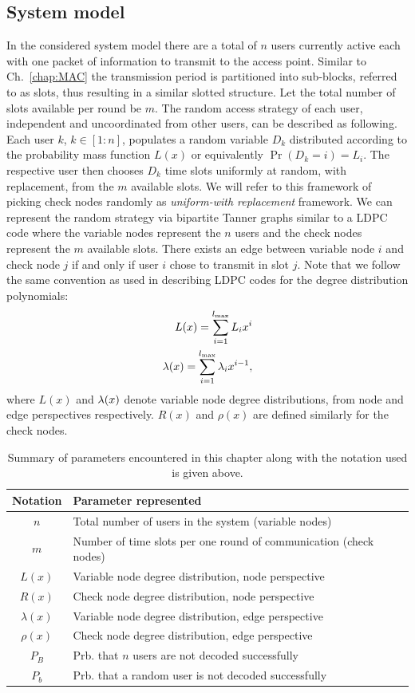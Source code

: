 \subsection{System model}
In the considered system model there are a total of $n$ users currently active each with one packet of information to transmit to the access point. Similar to Ch.~\ref{chap:MAC} the transmission period is partitioned into sub-blocks, referred to as slots, thus resulting in a similar slotted structure. Let the total number of slots available per round be $m$. The random access strategy of each user, independent and uncoordinated from other users, can be described as following. Each user $k$, $k\in [1:n]$, populates a random variable $D_{k}$ distributed according to the probability mass function $L(x)$ or equivalently $\Pr(D_{k}=i)=L_{i}$. The respective user then chooses $D_{k}$ time slots uniformly at random, with replacement, from the $m$ available slots. We will refer to this framework of picking check nodes randomly as \textit{uniform-with replacement} framework. We can represent the random strategy via bipartite Tanner graphs similar to a LDPC code where the variable nodes represent the $n$ users and the check nodes represent the $m$ available slots. There exists an edge between variable node $i$ and check node $j$ if and only if user $i$ chose to transmit in slot $j$. Note that we follow the same convention as used in describing LDPC codes for the degree distribution polynomials:
\begin{align}
L(x)=\sum_{i=1}^{l_{\text{max}}} L_{i}x^{i}\label{eqn:varnodedd_LDPC}\\
\lambda(x)=\sum_{i=1}^{l_{\text{max}}} \lambda_{i}x^{i-1},\notag
\end{align}
where $L(x)$ and $\lambda(x)$ denote variable node degree distributions, from node and edge perspectives respectively.
$R(x)$ and $\rho(x)$ are defined similarly for the check nodes. 
\begin{table}[!ht]
\centering
\begin{tabular}{|c|l|}
\hline
Notation & Parameter represented\\
\hline
$n$ & Total number of users in the system (variable nodes)\\ %
$m$ & Number of time slots per one round of communication (check nodes)\\ %
$L(x)$ & Variable node degree distribution, node perspective\\
$R(x)$& Check node degree distribution, node perspective\\
$\lambda(x)$ & Variable node degree distribution, edge perspective\\
$\rho(x)$& Check node degree distribution, edge perspective\\
$P_B$ & Prb. that $n$ users are not decoded successfully \\
$P_b$ & Prb. that a random user is not decoded successfully \\
\hline
\end{tabular}
\caption{Summary of parameters encountered in this chapter along with the notation used is given above.}
\label{table:notaiton_randomMAC}
\end{table}
